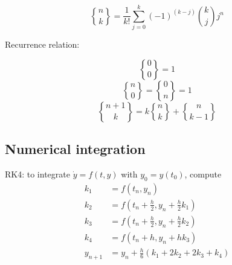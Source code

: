 $${n \brace k}=\frac{1}{k!}\sum_{j=0}^{k}(-1)^{(k-j)}{k \choose j}j^n$$

Recurrence relation:

  $${0 \brace 0}=1$$
  $${n \brace 0}={0 \brace n}=1$$
  $${n+1 \brace k}=k{n \brace k}+{n \brace k-1}$$


\subsection{Numerical integration}
RK4: to integrate $\dot{y} = f(t, y)$ with $y_0 = y(t_0)$, compute
\begin{align*}
  k_1 &= f(t_n, y_n) \\
  k_2 &= f(t_n + \frac h 2, y_n + \frac h 2 k_1) \\
  k_3 &= f(t_n + \frac h 2, y_n + \frac h 2 k_2) \\
  k_4 &= f(t_n + h, y_n + h k_3) \\
  y_{n+1} &= y_n + \frac h 6 (k_1 + 2k_2 + 2k_3 + k_4) 
\end{align*}
